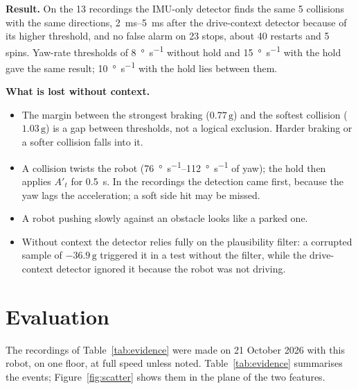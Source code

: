 \documentclass[11pt,a4paper]{article}
\newcommand{\g}{\,\mathrm{g}}
\begin{document}
\textbf{Result.} On the 13 recordings the IMU-only detector finds the same 5 collisions with
the same directions, \SIrange{2}{5}{\milli\second} after the drive-context detector because of
its higher threshold, and no false alarm on 23 stops, about 40 restarts and 5 spins. Yaw-rate
thresholds of \SI{8}{\degree\per\second} without hold and \SI{15}{\degree\per\second} with
the hold gave the same result; \SI{10}{\degree\per\second} with the hold lies between them.

\textbf{What is lost without context.}
\begin{itemize}
  \item The margin between the strongest braking ($0.77\g$) and the softest collision
    ($1.03\g$) is a gap between thresholds, not a logical exclusion. Harder braking or a softer
    collision falls into it.
  \item A collision twists the robot (\SIrange{76}{112}{\degree\per\second} of yaw); the hold
    then applies $A'_t$ for \SI{0.5}{\second}. In the recordings the detection came first,
    because the yaw lags the acceleration; a soft side hit may be missed.
  \item A robot pushing slowly against an obstacle looks like a parked one.
  \item Without context the detector relies fully on the plausibility filter: a corrupted sample
    of $-36.9\g$ triggered it in a test without the filter, while the drive-context detector
    ignored it because the robot was not driving.
\end{itemize}

\section{Evaluation}
\label{sec:evaluation}

The recordings of Table~\ref{tab:evidence} were made on 21 October 2026 with this robot, on one
floor, at full speed unless noted. Table~\ref{tab:evidence} summarises the events;
Figure~\ref{fig:scatter} shows them in the plane of the two features.
\end{document}
